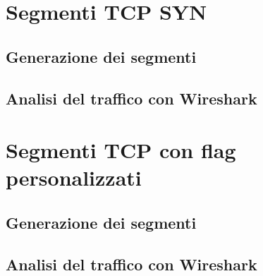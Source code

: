 \documentclass[12pt,a4paper]{report}
\begin{document}
\chapter{Segmenti TCP SYN}

\section{Generazione dei segmenti}
\section{Analisi del traffico con Wireshark}

\chapter{Segmenti TCP con flag personalizzati}

\section{Generazione dei segmenti}
\section{Analisi del traffico con Wireshark}
\end{document}
